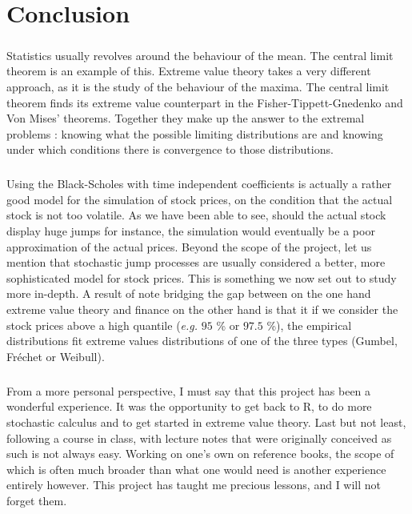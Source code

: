 \chapter{Conclusion}
\paragraph{}
Statistics usually revolves around the behaviour of the mean. The central limit theorem is an example of this. Extreme value theory takes a very different approach, as it is the study of the behaviour of the maxima. The central limit theorem finds its extreme value counterpart in the Fisher-Tippett-Gnedenko and Von Mises' theorems. Together they make up the answer to the extremal problems : knowing what the possible limiting distributions are and knowing under which conditions there is convergence to those distributions.
\paragraph{}
Using the Black-Scholes with time independent coefficients is actually a rather good model for the simulation of stock prices, on the condition that the actual stock is not too volatile. As we have been able to see, should the actual stock display huge jumps for instance, the simulation would eventually be a poor approximation of the actual prices. Beyond the scope of the project, let us mention that stochastic jump processes are usually considered a better, more sophisticated model for stock prices. This is something we now set out to study more in-depth.\newline
A result of note bridging the gap between on the one hand extreme value theory and finance on the other hand is that it if we consider the stock prices above a high quantile (\textit{e.g.} $95$ \% or $97.5$ \%), the empirical distributions fit extreme values distributions of one of the three types (Gumbel, Fréchet or Weibull).

\bigskip
\paragraph{}
From a more personal perspective, I must say that this project has been a wonderful experience. It was the opportunity to get back to R, to do more stochastic calculus and to get started in extreme value theory. Last but not least, following a course in class, with lecture notes that were originally conceived as such is not always easy. Working on one's own on reference books, the scope of which is often much broader than what one would need is another experience entirely however. This project has taught me precious lessons, and I will not forget them.